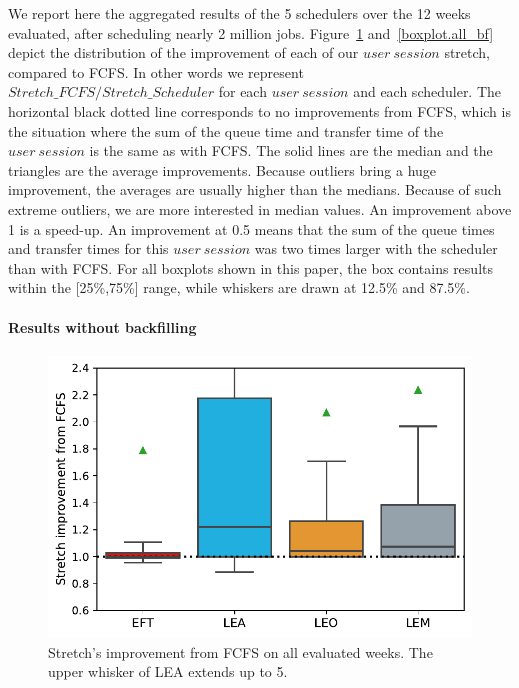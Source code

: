 \documentclass[conference]{IEEEtran}
\newcommand{\us}{\ensuremath{\mathit{user~session}}\xspace}
\begin{document}
We report here the aggregated results of the 5 schedulers over the 12 weeks evaluated, after scheduling nearly 2 million jobs.
Figure~\ref{boxplot.all} and~\ref{boxplot.all_bf} depict 
the distribution of the improvement of each of our \us stretch, compared to FCFS.
In other words we represent $\mathit{Stretch\_FCFS}/\mathit{Stretch\_Scheduler}$ for each \us and each scheduler.
The horizontal black dotted line corresponds to no improvements from FCFS, which
is the situation where the sum of the queue time and transfer time of the \us is the same as with FCFS.
The solid lines are the median and the triangles are the average
improvements.
Because outliers bring a huge improvement, the averages are usually higher than the medians.
Because of such extreme outliers, we are more interested in median values.
An improvement above 1 is a speed-up. An improvement at 0.5 means that
the sum of the queue times and transfer times for this \us was two
times larger with the scheduler than with FCFS.
For all boxplots shown in this paper, the box contains results within
the [25\%,75\%] range, while whiskers are drawn at 12.5\% and 87.5\%.


\paragraph{Results without backfilling}

\begin{figure}[t]\centering\includegraphics[width=0.9\linewidth]{../MBSS/plot/Boxplot/byuser/box_plot_stretch_all-all_1.pdf}\caption{Stretch's improvement from FCFS on all evaluated weeks. The upper whisker of LEA extends up to 5.}\label{boxplot.all}\end{figure}
\end{document}
